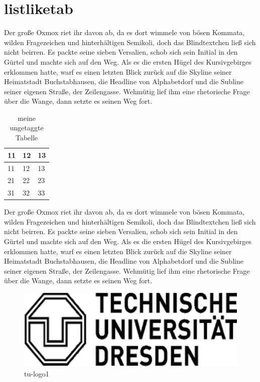 \documentclass[%
	12pt,%
	a4paper,%
	oneside,%
	listof=totoc, index=totoc, bibliography=totoc, %
	parskip=half,%
	chapterprefix=false,%
	appendixprefix, %
	headings=small,%
	captions=tableheading,%
]{scrreprt}
\newcommand{\alt}[1]{}%
\newcommand{\thead}[1]{\textbf{#1}}
\begin{document}
\chapter{listliketab}

Der große Oxmox riet ihr davon ab, da es dort wimmele von bösen Kommata, wilden Fragezeichen und hinterhältigen Semikoli, doch das Blindtextchen ließ sich nicht beirren. Es packte seine sieben Versalien, schob sich sein Initial in den Gürtel und machte sich auf den Weg. Als es die ersten Hügel des Kursivgebirges erklommen hatte, warf es einen letzten Blick zurück auf die Skyline seiner Heimatstadt Buchstabhausen, die Headline von Alphabetdorf und die Subline seiner eigenen Straße, der Zeilengasse. Wehmütig lief ihm eine rhetorische Frage über die Wange, dann setzte es seinen Weg fort.

\begin{table}[htbp]
	\centering
		\begin{tabular}{l|l l}
			\thead{11} & \thead{12} & \thead{13} \\ \hline
			11 & 12 & 13 \\
			21 & 22 & 23 \\
			31 & 32 & 33
		\end{tabular}
	\caption{meine ungetaggte Tabelle}
	\label{tab:meineUngetaggteTabelle}
\end{table}

Der große Oxmox riet ihr davon ab, da es dort wimmele von bösen Kommata, wilden Fragezeichen und hinterhältigen Semikoli, doch das Blindtextchen ließ sich nicht beirren. Es packte seine sieben Versalien, schob sich sein Initial in den Gürtel und machte sich auf den Weg. Als es die ersten Hügel des Kursivgebirges erklommen hatte, warf es einen letzten Blick zurück auf die Skyline seiner Heimatstadt Buchstabhausen, die Headline von Alphabetdorf und die Subline seiner eigenen Straße, der Zeilengasse. Wehmütig lief ihm eine rhetorische Frage über die Wange, dann setzte es seinen Weg fort.

\begin{figure}[htbp]
		\centering
		\alt{Ich bin das Logo der Technischen Universität Dresden}
		\includegraphics[scale=0.50]{images/tu_logo}%
	\caption[tu]{tu-logo1}%
	\label{fig:tulogo1}
\end{figure}
\end{document}
